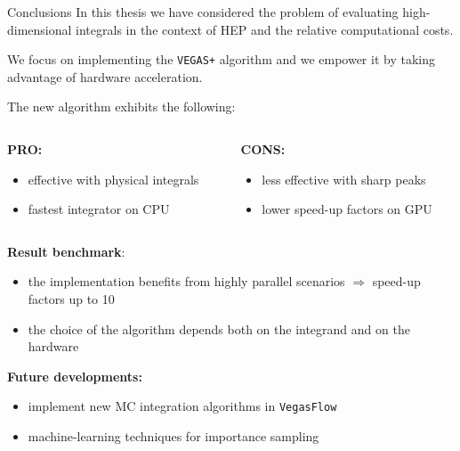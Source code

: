 \documentclass[t,handout,professionalfont,serif]{beamer}
\begin{document}
\begin{frame}{Conclusions}
	\scriptsize
	In this thesis we have considered the problem of evaluating high-dimensional integrals in the context of HEP and 
	the relative computational costs.
	
	We focus on implementing the \texttt{VEGAS+} algorithm and we empower it by taking advantage of hardware acceleration.
	\vspace{0.5cm}
	
	The new algorithm exhibits the following:
\vspace{0.2cm}
	\begin{columns}
		\begin{column}{0.5 \textwidth}
			\textbf{PRO:}
			\begin{itemize}
				\item effective with  physical integrals
				\item fastest integrator on CPU
			\end{itemize}
		\end{column}
			\begin{column}{0.5 \textwidth}
		\textbf{CONS:}
		\begin{itemize}
			\item less effective with sharp peaks
			\item lower speed-up factors on GPU
		\end{itemize}
	\end{column}
	\end{columns}

\vspace{0.5cm}
	
\textbf{Result benchmark}:
	
	\begin{itemize}
		\item the implementation benefits from highly parallel scenarios $\Rightarrow$ speed-up factors up to 10

		\item the choice of the algorithm depends both on the integrand and on the hardware
		
	\end{itemize}
\vspace{0.5cm}

\textbf{Future developments:}
\begin{itemize}
	\item implement new MC integration algorithms in \texttt{VegasFlow}
	\item machine-learning techniques for importance sampling
\end{itemize}
	
\end{frame}
\end{document}
